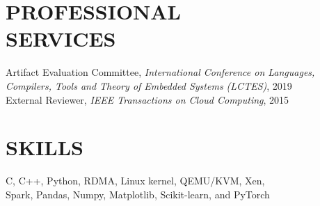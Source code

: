 \documentclass[margin]{res}
\begin{document}
\begin{resume}
\section{PROFESSIONAL \\ SERVICES}
\par
Artifact Evaluation Committee, \textit{International Conference on Languages, Compilers, Tools and Theory of Embedded Systems (LCTES)}, 2019 \\

\vspace{-2.0em}
External Reviewer, \textit{IEEE Transactions on Cloud Computing}, 2015 \\

\vspace{-1.0em}
\section{SKILLS}
\par
C, C++, Python, RDMA, Linux kernel, QEMU/KVM, Xen, \\Spark, Pandas, Numpy, Matplotlib, Scikit-learn, and PyTorch

\end{resume}
\end{document}
